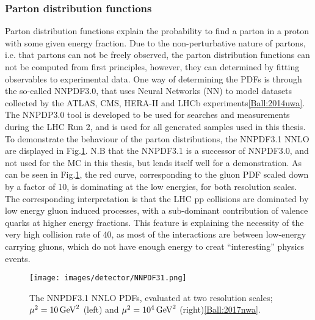 \subsubsection{Parton distribution functions}
Parton distribution functions explain the probability to find a parton in a proton with some given energy fraction. 
Due to the non-perturbative nature of partons, i.e. that partons can not be freely observed, the parton distribution functions can not be computed from first principles, however, they can determined by fitting observables to experimental data. 
One way of determining the PDFs is through the so-called NNPDF3.0, that uses Neural Networks (NN) to model datasets collected by the ATLAS, CMS, HERA-II and LHCb experiments\ref{Ball:2014uwa}. 
The NNPDP3.0 tool is developed to be used for searches and measurements during the LHC Run 2, and is used for all generated samples used in this thesis. 
To demonstrate the behaviour of the parton distributions, the NNPDF3.1 NNLO are displayed in Fig.\ref{fig:NNPDF31}. 
N.B that the NNPDF3.1 is a successor of NNPDF3.0, and not used for the MC in this thesis, but lends itself well for a demonstration. 
As can be seen in Fig.\ref{fig:NNPDF31}, the red curve, corresponding to the gluon PDF scaled down by a factor of 10, is dominating at the low energies, for both resolution scales. 
The corresponding interpretation is that the LHC pp collisions are dominated by low energy gluon induced processes, with a sub-dominant contribution of valence quarks at higher energy fractions. 
This feature is explaining the necessity of the very high collision rate of 40\MHz, as most of the interactions are between low-energy carrying gluons, which do not have enough energy to creat ``interesting'' physics events.  
\begin{figure}[!htp]
  \centering
   \texttt{[image: images/detector/NNPDF31.png]}
   \caption{The NNPDF3.1 NNLO PDFs, evaluated at two resolution scales; $\mu^{2}=10\,\text{Ge\hspace{-.08em}V}^{2}$ (left) and  $\mu^{2}=10^{4}\,\text{Ge\hspace{-.08em}V}^{2}$ (right)\ref{Ball:2017nwa}.}
   \label{fig:NNPDF31}
\end{figure}
